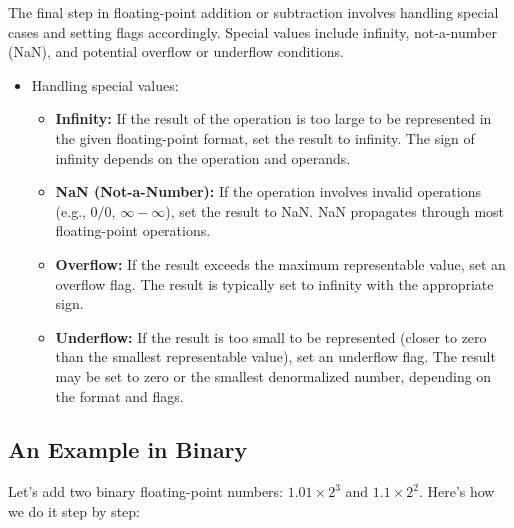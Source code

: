 \documentclass[12pt,openany, tikz,border=10pt]{book}
\begin{document}
			      	The final step in floating-point addition or subtraction involves handling special cases and setting flags accordingly. Special values include infinity, not-a-number (NaN), and potential overflow or underflow conditions.
			      	    
			      	\begin{itemize}
			      		\item[] Handling special values:
			      		      \begin{itemize}
			      		      	\item \textbf{Infinity:} If the result of the operation is too large to be represented in the given floating-point format, set the result to infinity. The sign of infinity depends on the operation and operands.
			      		      	\item \textbf{NaN (Not-a-Number):} If the operation involves invalid operations (e.g., \(0/0\), \(\infty - \infty\)), set the result to NaN. NaN propagates through most floating-point operations.
			      		      	\item \textbf{Overflow:} If the result exceeds the maximum representable value, set an overflow flag. The result is typically set to infinity with the appropriate sign.
			      		      	\item \textbf{Underflow:} If the result is too small to be represented (closer to zero than the smallest representable value), set an underflow flag. The result may be set to zero or the smallest denormalized number, depending on the format and flags.
			      		      \end{itemize}
			      	\end{itemize}
			      	
			      	
			      	\subsection{An Example in Binary}
			      	
			      	Let's add two binary floating-point numbers: $1.01 \times 2^3$ and $1.1 \times 2^2$. Here's how we do it step by step:
			      	
\end{document}
